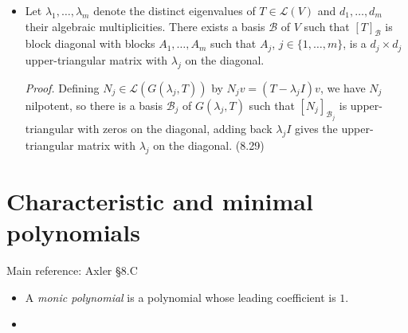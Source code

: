 \documentclass[11pt]{article}
\newcommand{\1}{\mathbf{1}}
\newcommand{\0}{\mathbf{0}}
\newcommand{\C}{\mathbb{C}}
\newcommand{\F}{\mathbb{F}}
\newcommand{\cL}{\mathcal{L}}
\newcommand{\R}{\mathbb{R}}
\DeclareMathOperator{\myrange}{\mathsf{range}}
\DeclareMathOperator{\myker}{\mathsf{ker}}
\renewcommand{\geq}{\geqslant}
\begin{document}
{\begin{itemize}
\emph{Proof.} We use the observation that $\myker p(T)$ and $\myrange p(T)$ are invariant under $T$ for any complex polynomial $p(z)$, in particular for $p(z)=(z-\lambda_j)^n$.
Invariance of $G(\lambda_j,T)$ under $T$ follow from this, nilpotence follows from definition of $G(\lambda,T)$.
For the direct sum, recall that operators on complex spaces have at least one $\lambda_1$, write $V = G(\lambda_1, T) \oplus U$ with $U = \myrange (T-\lambda_1 I)^n$ invariant under $T$.
Let $S=T_{|_U} \in \cL(U)$.
The $\lambda_1$-eigenvectors are in $G(\lambda_1,T)$, hence not in $U$.
By induction on $n$, $U = G(\lambda_2,S) \oplus \cdots \oplus G(\lambda_m,S)$.
Since $G(\lambda,S)\subset G(\lambda,T)$, $G(\lambda_1,T)+ \cdots + G(\lambda_m,T) = V$.
Direct sum follows from linear independence of generalized eigenvectors.
\hfill
(8.21)

\item

Let $\lambda_1,\dots,\lambda_m$ denote the distinct eigenvalues of $T\in\mathcal{L}(V)$ and $d_1,\dots,d_m$ their algebraic multiplicities.
There exists a basis $\mathcal{B}$ of $V$ such that $[T]_{\mathcal{B}}$ is block diagonal with blocks $A_1,\dots,A_m$ such that $A_j$, $j\in\{1,\dots,m\}$, is a $d_j\times d_j$ upper-triangular matrix with $\lambda_j$ on the diagonal.

\emph{Proof.}
Defining $N_j \in \cL(G(\lambda_j,T))$ by $N_j v = (T - \lambda_j I) v$, we have $N_j$ nilpotent, so there is a basis $\mathcal{B}_j$ of $G(\lambda_j,T)$ such that $[N_j]_{\mathcal{B}_j}$ is upper-triangular with zeros on the diagonal, adding back $\lambda_j I$ gives the upper-triangular matrix with $\lambda_j$ on the diagonal.
\hfill
(8.29)

\end{itemize}


\clearpage
\section{Characteristic and minimal polynomials}

Main reference:
Axler \S8.C

\begin{itemize}

\item

A {\it monic polynomial} is a polynomial whose leading coefficient is $1$.

\item


\end{itemize}}
\end{document}
